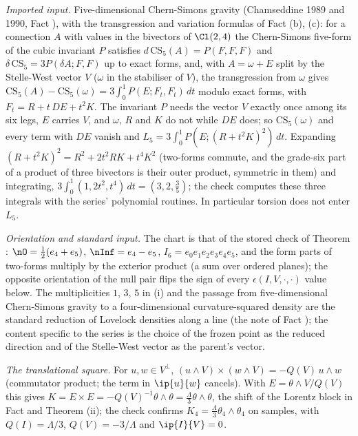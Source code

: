 \emph{Imported input.} Five-dimensional Chern-Simons gravity (Chamseddine 1989 and 1990, Fact ), with the transgression and variation formulas of Fact (b), (c): for a connection $A$ with values in the bivectors of $\Cl(2,4)$ the Chern-Simons five-form of the cubic invariant $P$ satisfies $d\,\mathrm{CS}_{5}(A) = P(F, F, F)$ and $\delta\,\mathrm{CS}_{5} = 3P(\delta A; F, F)$ up to exact forms, and, with $A = \omega + E$ split by the Stelle-West vector $V$ ($\omega$ in the stabiliser of $V$), the transgression from $\omega$ gives $\mathrm{CS}_{5}(A) - \mathrm{CS}_{5}(\omega) = 3\int_{0}^{1}P(E; F_{t}, F_{t})\,dt$ modulo exact forms, with $F_{t} = R + t\,DE + t^{2}K$. The invariant $P$ needs the vector $V$ exactly once among its six legs, $E$ carries $V$, and $\omega$, $R$ and $K$ do not while $DE$ does; so $\mathrm{CS}_{5}(\omega)$ and every term with $DE$ vanish and $L_{5} = 3\int_{0}^{1}P(E; (R + t^{2}K)^{2})\,dt$. Expanding $(R + t^{2}K)^{2} = R^{2} + 2t^{2}RK + t^{4}K^{2}$ (two-forms commute, and the grade-six part of a product of three bivectors is their outer product, symmetric in them) and integrating, $3\int_{0}^{1}(1, 2t^{2}, t^{4})\,dt = (3, 2, \tfrac35)$; the check computes these three integrals with the series' polynomial routines. In particular torsion does not enter $L_{5}$.

\emph{Orientation and standard input.} The chart is that of the stored check of Theorem : $\nO = \tfrac12(e_{4} + e_{5})$, $\nInf = e_{4} - e_{5}$, $I_{6} = e_{0}e_{1}e_{2}e_{3}e_{4}e_{5}$, and the form parts of two-forms multiply by the exterior product (a sum over ordered planes); the opposite orientation of the null pair flips the sign of every $\epsilon(I, V, \cdot, \cdot)$ value below. The multiplicities $1$, $3$, $5$ in (i) and the passage from five-dimensional Chern-Simons gravity to a four-dimensional curvature-squared density are the standard reduction of Lovelock densities along a line (the note of Fact ); the content specific to the series is the choice of the frozen point as the reduced direction and of the Stelle-West vector as the parent's vector.

\emph{The translational square.} For $u, w \in V^{\perp}$, $(u\wedge V)\times(w\wedge V) = -Q(V)\,u\wedge w$ (commutator product; the term in $\ip{u}{w}$ cancels). With $E = \theta\wedge V/Q(V)$ this gives $K = E\times E = -Q(V)^{-1}\theta\wedge\theta = \tfrac{\Lambda}{3}\theta\wedge\theta$, the shift of the Lorentz block in Fact  and Theorem (ii); the check confirms $K_{4} = \tfrac{\Lambda}{3}\theta_{4}\wedge\theta_{4}$ on samples, with $Q(I) = \Lambda/3$, $Q(V) = -3/\Lambda$ and $\ip{I}{V} = 0$.


